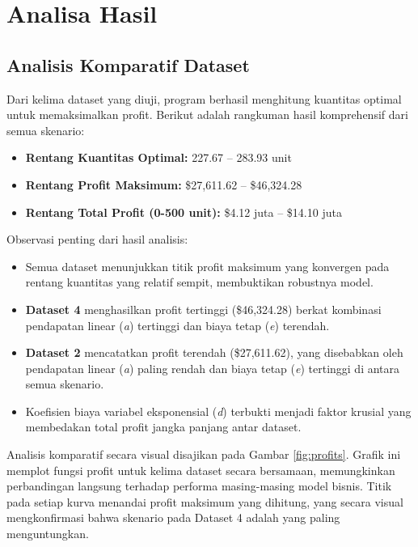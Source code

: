 \documentclass[conference]{IEEEtran}
\begin{document}
\section{Analisa Hasil}

\subsection{Analisis Komparatif Dataset}
Dari kelima dataset yang diuji, program berhasil menghitung kuantitas optimal untuk memaksimalkan profit. Berikut adalah rangkuman hasil komprehensif dari semua skenario:
\begin{itemize}
    \item \textbf{Rentang Kuantitas Optimal:} 227.67 – 283.93 unit
    \item \textbf{Rentang Profit Maksimum:} \$27,611.62 – \$46,324.28
    \item \textbf{Rentang Total Profit (0-500 unit):} \$4.12 juta – \$14.10 juta
\end{itemize}

Observasi penting dari hasil analisis:
\begin{itemize}
    \item Semua dataset menunjukkan titik profit maksimum yang konvergen pada rentang kuantitas yang relatif sempit, membuktikan robustnya model.
    \item \textbf{Dataset 4} menghasilkan profit tertinggi (\$46,324.28) berkat kombinasi pendapatan linear (\textit{a}) tertinggi dan biaya tetap (\textit{e}) terendah.
    \item \textbf{Dataset 2} mencatatkan profit terendah (\$27,611.62), yang disebabkan oleh pendapatan linear (\textit{a}) paling rendah dan biaya tetap (\textit{e}) tertinggi di antara semua skenario.
    \item Koefisien biaya variabel eksponensial (\textit{d}) terbukti menjadi faktor krusial yang membedakan total profit jangka panjang antar dataset.
\end{itemize}

Analisis komparatif secara visual disajikan pada Gambar \ref{fig:profits}. Grafik ini memplot fungsi profit untuk kelima dataset secara bersamaan, memungkinkan perbandingan langsung terhadap performa masing-masing model bisnis. Titik pada setiap kurva menandai profit maksimum yang dihitung, yang secara visual mengkonfirmasi bahwa skenario pada Dataset 4 adalah yang paling menguntungkan.
\end{document}
